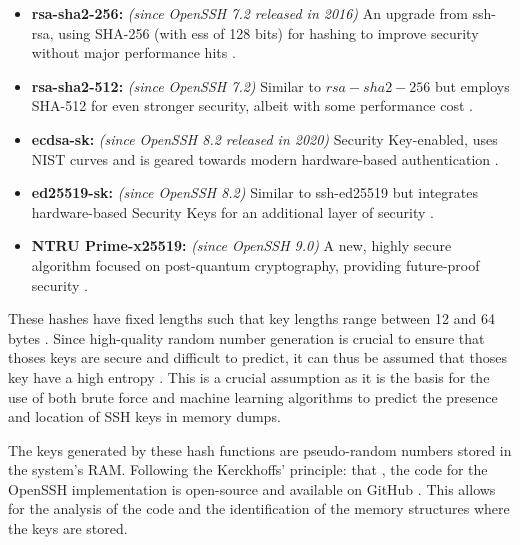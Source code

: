 \begin{itemize}
        \item \textbf{rsa-sha2-256:} \textit{(since OpenSSH 7.2 released in 2016)} An upgrade from ssh-rsa, using SHA-256 (with \acrshort{ess} of 128 bits) for hashing to improve security without major performance hits \cite{OpenSSHReleaseNotes7-2}.
         
        \item \textbf{rsa-sha2-512:} \textit{(since OpenSSH 7.2)} Similar to $rsa-sha2-256$ but employs SHA-512 for even stronger security, albeit with some performance cost \cite{OpenSSHReleaseNotes7-2}.
        
        \item \textbf{ecdsa-sk:} \textit{(since OpenSSH 8.2 released in 2020)} Security Key-enabled, uses NIST curves and is geared towards modern hardware-based authentication \cite{OpenSSHReleaseNotes8-2}.
        
        \item \textbf{ed25519-sk:} \textit{(since OpenSSH 8.2)} Similar to ssh-ed25519 but integrates hardware-based Security Keys for an additional layer of security \cite{OpenSSHReleaseNotes8-2}.
        
        \item \textbf{NTRU Prime-x25519:} \textit{(since OpenSSH 9.0)} A new, highly secure algorithm focused on post-quantum cryptography, providing future-proof security \cite{NTRUPostQuantum17} \cite{OpenSSHReleaseNotes9-0}.
    \end{itemize}
    
    These hashes have fixed lengths such that key lengths range between 12 and 64 bytes \cite{SmartKex22}. Since high-quality random number generation is crucial to ensure that thoses keys are secure and difficult to predict, it can thus be assumed that thoses key have a high entropy \cite{McLaren2019}. This is a crucial assumption as it is the basis for the use of both brute force and machine learning algorithms to predict the presence and location of SSH keys in memory dumps.

    The keys generated by these hash functions are pseudo-random numbers stored in the system's RAM. Following the Kerckhoffs' principle: that , the code for the OpenSSH implementation is open-source and available on GitHub \cite{PortableOpenSSHGitHub}. This allows for the analysis of the code and the identification of the memory structures where the keys are stored.

